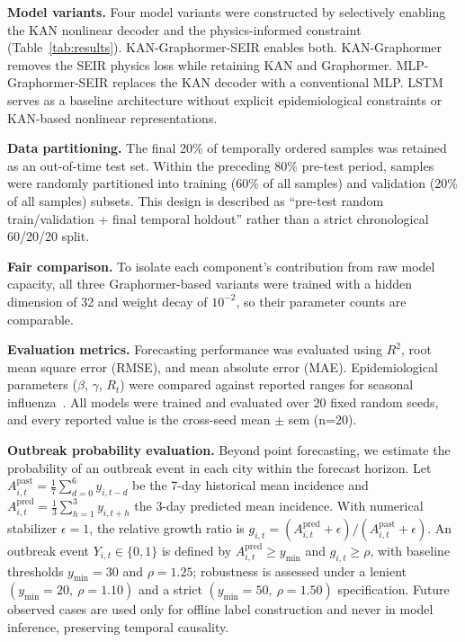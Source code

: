 \documentclass[10pt,letterpaper]{article}
\begin{document}
	\noindent\textbf{Model variants.}
	Four model variants were constructed by selectively enabling the KAN nonlinear decoder and the physics-informed constraint (Table~\ref{tab:results}). KAN-Graphormer-SEIR enables both. KAN-Graphormer removes the SEIR physics loss while retaining KAN and Graphormer. MLP-Graphormer-SEIR replaces the KAN decoder with a conventional MLP. LSTM~\cite{hochreiter1997} serves as a baseline architecture without explicit epidemiological constraints or KAN-based nonlinear representations.
	
	\noindent\textbf{Data partitioning.}
	The final 20\% of temporally ordered samples was retained as an out-of-time test
	set. Within the preceding 80\% pre-test period, samples were randomly partitioned
	into training (60\% of all samples) and validation (20\% of all samples) subsets.
	This design is described as ``pre-test random train/validation + final temporal
	holdout'' rather than a strict chronological 60/20/20 split.
	
	\noindent\textbf{Fair comparison.}
	To isolate each component's contribution from raw model capacity, all three
	Graphormer-based variants were trained with a hidden dimension of 32 and
	weight decay of $10^{-2}$, so their parameter counts are comparable.%
	
	\noindent\textbf{Evaluation metrics.}
	Forecasting performance was evaluated using $R^2$, root mean square error (RMSE),
	and mean absolute error (MAE). Epidemiological parameters ($\beta$, $\gamma$, $R_t$) were compared
	against reported ranges for seasonal influenza~\cite{tang2020}. All models were
	trained and evaluated over 20 fixed random seeds, and every reported value is the
	cross-seed mean $\pm$ sem (n=20).
	
	\noindent\textbf{Outbreak probability evaluation.}
	Beyond point forecasting, we estimate the probability of an outbreak event in each city within the forecast horizon. Let $A^{\mathrm{past}}_{i,t} = \frac{1}{7}\sum_{d=0}^{6} y_{i,t-d}$ be the 7-day historical mean incidence and $A^{\mathrm{pred}}_{i,t} = \frac{1}{3}\sum_{h=1}^{3} y_{i,t+h}$ the 3-day predicted mean incidence. With numerical stabilizer $\epsilon = 1$, the relative growth ratio is $g_{i,t} = (A^{\mathrm{pred}}_{i,t} + \epsilon)/(A^{\mathrm{past}}_{i,t} + \epsilon)$. An outbreak event $Y_{i,t} \in \{0,1\}$ is defined by $A^{\mathrm{pred}}_{i,t} \geq y_{\min}$ and $g_{i,t} \geq \rho$, with baseline thresholds $y_{\min} = 30$ and $\rho = 1.25$; robustness is assessed under a lenient $(y_{\min}=20,\ \rho=1.10)$ and a strict $(y_{\min}=50,\ \rho=1.50)$ specification. Future observed cases are used only for offline label construction and never in model inference, preserving temporal causality.
	
\end{document}
